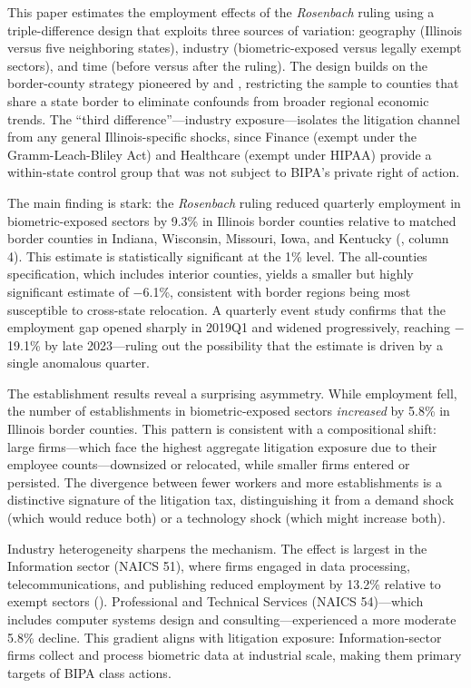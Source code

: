 \documentclass[12pt]{article}
\begin{document}
This paper estimates the employment effects of the \emph{Rosenbach} ruling using a triple-difference design that exploits three sources of variation: geography (Illinois versus five neighboring states), industry (biometric-exposed versus legally exempt sectors), and time (before versus after the ruling). The design builds on the border-county strategy pioneered by \citet{dube2010} and \citet{holmes1998}, restricting the sample to counties that share a state border to eliminate confounds from broader regional economic trends. The ``third difference''---industry exposure---isolates the litigation channel from any general Illinois-specific shocks, since Finance (exempt under the Gramm-Leach-Bliley Act) and Healthcare (exempt under HIPAA) provide a within-state control group that was not subject to BIPA's private right of action.

The main finding is stark: the \emph{Rosenbach} ruling reduced quarterly employment in biometric-exposed sectors by 9.3\% in Illinois border counties relative to matched border counties in Indiana, Wisconsin, Missouri, Iowa, and Kentucky (, column 4). This estimate is statistically significant at the 1\% level. The all-counties specification, which includes interior counties, yields a smaller but highly significant estimate of $-$6.1\%, consistent with border regions being most susceptible to cross-state relocation. A quarterly event study confirms that the employment gap opened sharply in 2019Q1 and widened progressively, reaching $-$19.1\% by late 2023---ruling out the possibility that the estimate is driven by a single anomalous quarter.

The establishment results reveal a surprising asymmetry. While employment fell, the number of establishments in biometric-exposed sectors \emph{increased} by 5.8\% in Illinois border counties. This pattern is consistent with a compositional shift: large firms---which face the highest aggregate litigation exposure due to their employee counts---downsized or relocated, while smaller firms entered or persisted. The divergence between fewer workers and more establishments is a distinctive signature of the litigation tax, distinguishing it from a demand shock (which would reduce both) or a technology shock (which might increase both).

Industry heterogeneity sharpens the mechanism. The effect is largest in the Information sector (NAICS 51), where firms engaged in data processing, telecommunications, and publishing reduced employment by 13.2\% relative to exempt sectors (). Professional and Technical Services (NAICS 54)---which includes computer systems design and consulting---experienced a more moderate 5.8\% decline. This gradient aligns with litigation exposure: Information-sector firms collect and process biometric data at industrial scale, making them primary targets of BIPA class actions.
\end{document}
